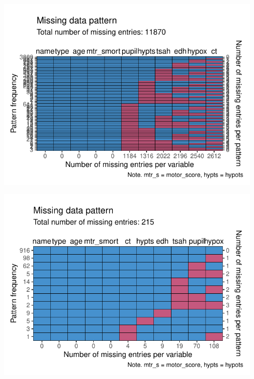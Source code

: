 \documentclass[
]{jss}
\begin{document}
\begin{CodeChunk}


\begin{center}\includegraphics{Manuscript_files/figure-latex/impact-1} \end{center}



\begin{center}\includegraphics{Manuscript_files/figure-latex/impact-2} \end{center}




\end{CodeChunk}
\end{document}
